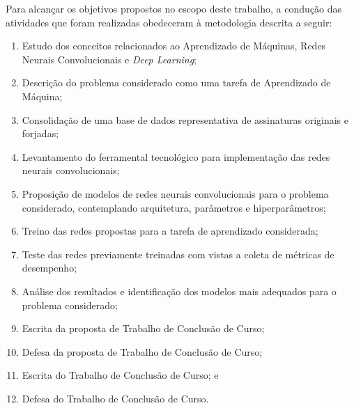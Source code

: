 
Para alcançar os objetivos propostos no escopo deste trabalho, a condução das atividades que foram realizadas obedeceram à metodologia descrita a seguir:

\begin{enumerate}
  \item Estudo dos conceitos relacionados ao Aprendizado de Máquinas, Redes Neurais Convolucionais e \emph{Deep Learning};
  \item Descrição do problema considerado como uma tarefa de Aprendizado de Máquina;
  \item Consolidação de uma base de dados representativa de assinaturas originais e forjadas;
  \item Levantamento do ferramental tecnológico para implementação das redes neurais convolucionais;
  \item Proposição de modelos de redes neurais convolucionais para o problema considerado, contemplando arquitetura, parâmetros e hiperparâmetros;
  \item Treino das redes propostas para a tarefa de aprendizado considerada;
  \item Teste das redes previamente treinadas com vistas a coleta de métricas de desempenho;
  \item Análise dos resultados e identificação dos modelos mais adequados para o problema considerado;
  \item Escrita da proposta de Trabalho de Conclusão de Curso;
  \item Defesa da proposta de Trabalho de Conclusão de Curso;
  \item Escrita do Trabalho de Conclusão de Curso; e
  \item Defesa do Trabalho de Conclusão de Curso.
\end{enumerate}
